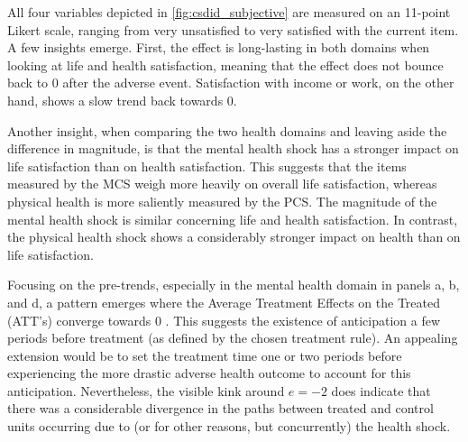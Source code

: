 All four variables depicted in \cref{fig:csdid_subjective} are measured on an 11-point Likert scale, ranging
from very unsatisfied to very satisfied with the current item. A few insights emerge. First, the effect is
long-lasting in both domains when looking at life and health satisfaction, meaning that the effect does not
bounce back to 0 after the adverse event. Satisfaction with income or work, on the other hand, shows a slow
trend back towards 0.

Another insight, when comparing the two health domains and leaving aside the difference in magnitude, is that the mental health shock has a stronger impact on life satisfaction than on health satisfaction. 
This suggests that the items measured by the MCS weigh more heavily on overall life satisfaction, whereas physical health is more saliently measured by the PCS.
The magnitude of the mental health shock is similar concerning life and health satisfaction. In contrast, the physical health shock shows a considerably stronger impact on health than on life satisfaction.


Focusing on the pre-trends, especially in the mental health domain in panels a, b, and d, a pattern emerges
where the Average Treatment Effects on the Treated (ATT's) converge towards 0 . 
This suggests the existence of anticipation a few periods before treatment (as defined by the chosen treatment rule).
An appealing extension would be to set the treatment time one or two periods before experiencing the more drastic adverse health
outcome to account for this anticipation. 
Nevertheless, the visible kink around $e=-2$ does indicate that there was a considerable divergence in the paths between treated and control units occurring due to (or for other reasons, but concurrently) the health shock.


